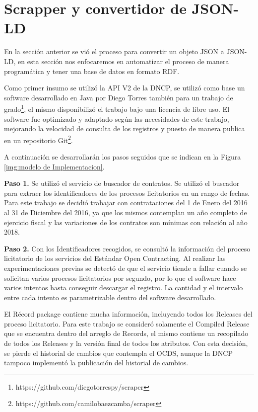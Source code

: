 \section{Scrapper y convertidor de JSON-LD}

En la sección anterior se vió el proceso para convertir un objeto JSON a JSON-LD, en esta sección nos enfocaremos en automatizar el proceso de manera programática y tener una base de datos en formato RDF.

Como primer insumo se utilizó la API V2 de la DNCP, se utilizó como base un software desarrollado en Java por Diego Torres también para un trabajo de grado\footnote{https://github.com/diegotorrespy/scraper}, el mismo disponibilizó el trabajo bajo una licencia de libre uso. El software fue optimizado y adaptado según las necesidades de este trabajo, mejorando la velocidad de consulta de los registros y puesto de manera publica en un repositorio Git\footnote{https://github.com/camilobaezcamba/scraper}.


A continuación se desarrollarán los pasos seguidos que se indican en la Figura \ref{img:modelo de Implementacion}.

\textbf{Paso 1.} Se utilizó el servicio de buscador de contratos. Se utilizó el buscador para extraer los identificadores de los procesos licitatorios en un rango de fechas. Para este trabajo se decidió trabajar con contrataciones del 1 de Enero del 2016 al 31 de Diciembre del 2016, ya que los mismos contemplan un año completo de ejercicio fiscal y las variaciones de los contratos son mínimas con relación al año 2018.



\textbf{Paso 2.} Con los Identificadores recogidos, se consultó la información del proceso licitatorio de los servicios del Estándar Open Contracting. Al realizar las experimentaciones previas se detectó de que el servicio tiende a fallar cuando se solicitan varios procesos licitatorios por segundo, por lo que el software hace varios intentos hasta conseguir descargar el registro. La cantidad y el intervalo entre cada intento es parametrizable dentro del software desarrollado.

El Récord package contiene mucha información, incluyendo todos los Releases del proceso licitatorio. Para este trabajo se consideró solamente el Compiled Release que se encuentra dentro del arreglo de Records, el mismo contiene un recopilado de todos los Releases y la versión final de todos los atributos. Con esta decisión, se pierde el historial de cambios que contempla el OCDS, aunque la DNCP tampoco implementó la publicación del historial de cambios.

